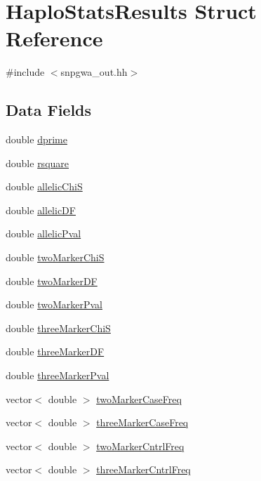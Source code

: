 \hypertarget{structHaploStatsResults}{
\section{HaploStatsResults Struct Reference}
\label{structHaploStatsResults}
}


{\ttfamily \#include $<$snpgwa\_\-out.hh$>$}

\subsection*{Data Fields}
\begin{DoxyCompactItemize}
\item 
double \hyperlink{structHaploStatsResults_abdc55b5be3f1c870b7517b415497462d}{dprime}
\item 
double \hyperlink{structHaploStatsResults_aab3f85e92eb99e62662c79cfbba82e92}{rsquare}
\item 
double \hyperlink{structHaploStatsResults_a4ae9d7106d01416edf42096967406710}{allelicChiS}
\item 
double \hyperlink{structHaploStatsResults_a031d9b3d4677c3f6dc666ff23149c70b}{allelicDF}
\item 
double \hyperlink{structHaploStatsResults_a1e2879503745bed4088a7146d25b57f1}{allelicPval}
\item 
double \hyperlink{structHaploStatsResults_aa8d4b951c0998e3f5da959dcb38f6f3c}{twoMarkerChiS}
\item 
double \hyperlink{structHaploStatsResults_a622dc51cdb7538b550713ccc4e63386c}{twoMarkerDF}
\item 
double \hyperlink{structHaploStatsResults_a294f5a3a746c5e7d4fd65afd76ae1bdf}{twoMarkerPval}
\item 
double \hyperlink{structHaploStatsResults_a8cfd3a05e18608f635c639e09fc773fe}{threeMarkerChiS}
\item 
double \hyperlink{structHaploStatsResults_a09ff4276f7574d68682eeca36e54e3c3}{threeMarkerDF}
\item 
double \hyperlink{structHaploStatsResults_aeb730deb184f94c39b9f818da4a7752d}{threeMarkerPval}
\item 
vector$<$ double $>$ \hyperlink{structHaploStatsResults_a2270d7ae0d0346b8ed09c4a19d45615d}{twoMarkerCaseFreq}
\item 
vector$<$ double $>$ \hyperlink{structHaploStatsResults_a0f87eea708cb853629fd6518b76978dd}{threeMarkerCaseFreq}
\item 
vector$<$ double $>$ \hyperlink{structHaploStatsResults_a87d2f0dfa6dc45c299aace3d59b00bda}{twoMarkerCntrlFreq}
\item 
vector$<$ double $>$ \hyperlink{structHaploStatsResults_a9c397335f2d645c90b44ba82ac3f141a}{threeMarkerCntrlFreq}
\end{DoxyCompactItemize}


